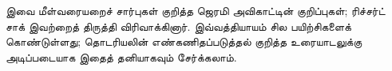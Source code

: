 \documentclass[../../../include/open-logic-chapter]{subfiles}
\begin{document}


\begin{editorial}
  இவை மீள்வரையறைச் சார்புகள் குறித்த ஜெரமி அவிகாட்டின் குறிப்புகள்;
  ரிச்சர்ட் சாக் இவற்றைத் திருத்தி விரிவாக்கினார். இவ்வத்தியாயம் சில
  பயிற்சிகளைக் கொண்டுள்ளது; தொடரியலின் எண்கணிதப்படுத்தல் குறித்த
  உரையாடலுக்கு அடிப்படையாக இதைத் தனியாகவும் சேர்க்கலாம்.
\end{editorial}





















\OLEndChapterHook
\end{document}
